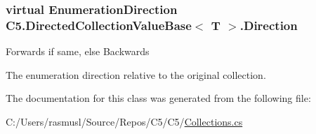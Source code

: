 \subsubsection[{Direction}]{\setlength{\rightskip}{0pt plus 5cm}virtual {\bf Enumeration\+Direction} {\bf C5.\+Directed\+Collection\+Value\+Base}$<$ T $>$.Direction\hspace{0.3cm}{\ttfamily [get]}}\label{class_c5_1_1_directed_collection_value_base_acb1489d931bddb60b2d220b60e355021}




{\ttfamily Forwards} if same, else {\ttfamily Backwards} 

The enumeration direction relative to the original collection.

The documentation for this class was generated from the following file\+:\begin{DoxyCompactItemize}
\item 
C\+:/\+Users/rasmusl/\+Source/\+Repos/\+C5/\+C5/\hyperlink{_collections_8cs}{Collections.\+cs}\end{DoxyCompactItemize}
